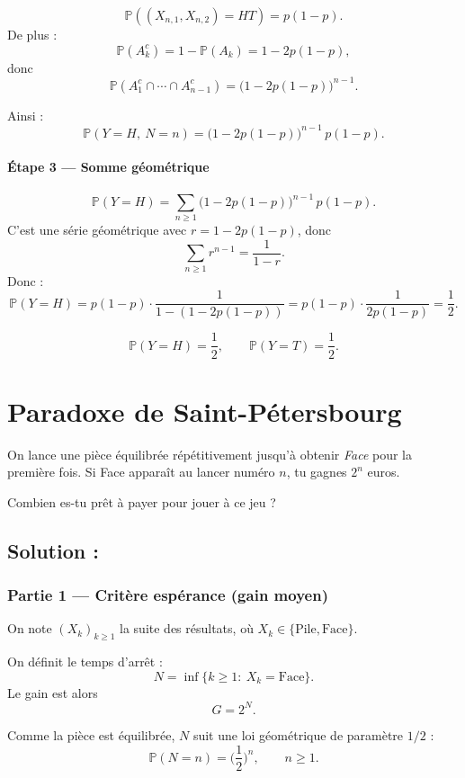 \[
\mathbb{P}((X_{n,1},X_{n,2})=HT)=p(1-p).
\]
De plus :
\[
\mathbb{P}(A_k^c)=1-\mathbb{P}(A_k)=1-2p(1-p),
\]
donc
\[
\mathbb{P}(A_1^c\cap\cdots\cap A_{n-1}^c)=\big(1-2p(1-p)\big)^{n-1}.
\]

Ainsi :
\[
\mathbb{P}(Y=H,\ N=n)=\big(1-2p(1-p)\big)^{n-1}\,p(1-p).
\]

\paragraph{Étape 3 — Somme géométrique}

\[
\mathbb{P}(Y=H)=\sum_{n\ge 1}\big(1-2p(1-p)\big)^{n-1}\,p(1-p).
\]
C'est une série géométrique avec $r=1-2p(1-p)$, donc
\[
\sum_{n\ge 1} r^{n-1}=\frac{1}{1-r}.
\]
Donc :
\[
\mathbb{P}(Y=H)
=
p(1-p)\cdot\frac{1}{1-(1-2p(1-p))}
=
p(1-p)\cdot\frac{1}{2p(1-p)}
=\frac12.
\]

\[
\boxed{\mathbb{P}(Y=H)=\frac12,\qquad \mathbb{P}(Y=T)=\frac12.}
\]


\section{Paradoxe de Saint-Pétersbourg}

\begin{exerciseBox}
On lance une pièce équilibrée répétitivement jusqu'à obtenir \emph{Face} pour la première fois.
Si Face apparaît au lancer numéro $n$, tu gagnes $2^n$ euros.

Combien es-tu prêt à payer pour jouer à ce jeu ?
\end{exerciseBox}

\subsection*{Solution :}

\subsubsection*{Partie 1 — Critère espérance (gain moyen)}

On note $(X_k)_{k\ge 1}$ la suite des résultats, où $X_k\in\{\text{Pile},\text{Face}\}$.

On définit le temps d'arrêt :
\[
N=\inf\{k\ge 1:\ X_k=\text{Face}\}.
\]
Le gain est alors
\[
G=2^N.
\]

Comme la pièce est équilibrée, $N$ suit une loi géométrique de paramètre $1/2$ :
\[
\mathbb{P}(N=n)=\Big(\frac12\Big)^n,\qquad n\ge 1.
\]

